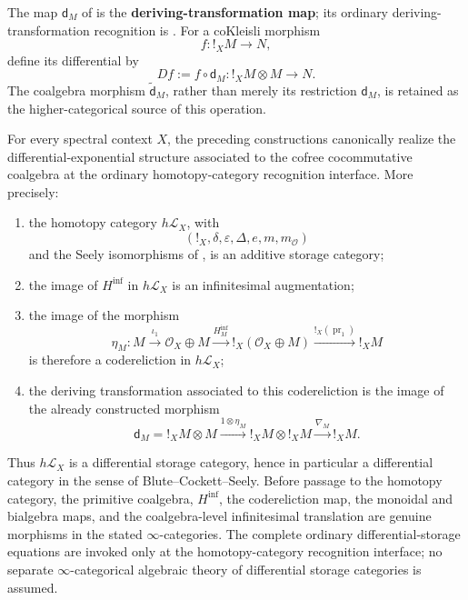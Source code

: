 \begin{construction}
\label{con:tangent-deriving-transformation}
The map \(\mathsf d_M\) of
 is the
\textbf{deriving-transformation map}; its ordinary deriving-transformation
recognition is . For a
coKleisli morphism
\[
    f:!_XM\longrightarrow N,
\]
define its differential by
\[
    Df:=f\circ\mathsf d_M:
    !_XM\otimes M\longrightarrow N.
\]
The coalgebra morphism \(\widetilde{\mathsf d}_M\), rather than merely its
restriction \(\mathsf d_M\), is retained as the higher-categorical source of
this operation.
\end{construction}

\begin{theorem}
\label{thm:tangent-differential-category-recognition}
For every spectral context \(X\), the preceding constructions canonically
realize the differential-exponential structure associated to the cofree
cocommutative coalgebra at the ordinary homotopy-category recognition
interface. More precisely:
\begin{enumerate}[label=(\roman*)]
    \item the homotopy category \(h\mathcal L_X\), with
    \[
        (!_X,\delta,\varepsilon,\Delta,e,m,m_{\mathcal O})
    \]
    and the Seely isomorphisms of
    , is an additive storage category;

    \item the image of \(H^{\inf}\) in \(h\mathcal L_X\) is an
    infinitesimal augmentation;

    \item the image of the morphism
    \[
        \eta_M:
        M\xrightarrow{\iota_1}
        \mathcal O_X\oplus M
        \xrightarrow{H^{\inf}_M}
        !_X(\mathcal O_X\oplus M)
        \xrightarrow{!_X(\operatorname{pr}_1)}
        !_XM
    \]
    is therefore a codereliction in \(h\mathcal L_X\);

    \item the deriving transformation associated to this codereliction is the
    image of the already constructed morphism
    \[
        \mathsf d_M
        =
        !_XM\otimes M
        \xrightarrow{1\otimes\eta_M}
        !_XM\otimes !_XM
        \xrightarrow{\nabla_M}
        !_XM.
    \]
\end{enumerate}
Thus \(h\mathcal L_X\) is a differential storage category, hence in
particular a differential category in the sense of
Blute--Cockett--Seely. Before passage to the homotopy category, the primitive
coalgebra, \(H^{\inf}\), the codereliction map, the monoidal and bialgebra
maps, and the coalgebra-level infinitesimal translation are genuine morphisms
in the stated \(\infty\)-categories. The complete ordinary
differential-storage equations are invoked only at the homotopy-category
recognition interface; no separate \(\infty\)-categorical algebraic theory of
differential storage categories is assumed.
\end{theorem}

